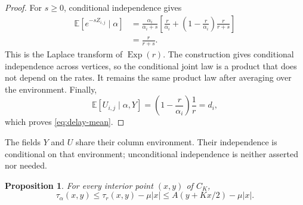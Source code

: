 \documentclass[11pt]{amsart}
\newtheorem{proposition}[theorem]{Proposition}
\theoremstyle{remark}
\newcommand{\EE}{\mathbb E}
\DeclareMathOperator{\Exp}{Exp}
\numberwithin{equation}{section}
\begin{document}
\begin{proof}
For $s\geq0$, conditional independence gives
\begin{align*}
 \EE[e^{-sZ_{i,j}}\mid\alpha]
 &=\frac{\alpha_i}{\alpha_i+s}
   \left[\frac r{\alpha_i}
    +\left(1-\frac r{\alpha_i}\right)\frac r{r+s}\right]\\
 &=\frac r{r+s}.
\end{align*}
This is the Laplace transform of $\Exp(r)$. The construction gives
conditional independence across vertices, so the conditional joint law
is a product that does not depend on the rates. It remains the same
product law after averaging over the environment. Finally,
\[
 \EE[U_{i,j}\mid\alpha,Y]
 =\left(1-\frac r{\alpha_i}\right)\frac1r=d_i,
\]
which proves \eqref{eq:delay-mean}.
\end{proof}

The fields $Y$ and $U$ share their column environment. Their
independence is conditional on that environment; unconditional
independence is neither asserted nor needed.

\begin{proposition}\label{prop:comparison}
For every interior point $(x,y)$ of $C_K$,
\begin{equation}\label{eq:comparison}
 \tau_\alpha(x,y)\leq\tau_r(x,y)-\mu|x|
                       \leq A(y+Kx/2)-\mu|x|.
\end{equation}
\end{proposition}
\end{document}
